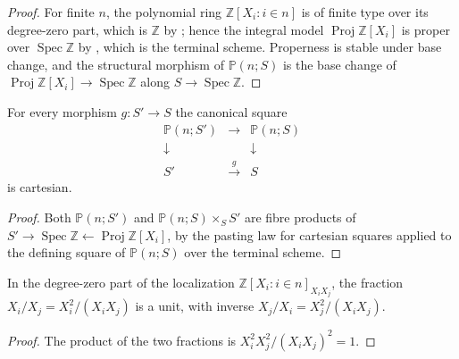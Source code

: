 \begin{proof}
  \leanok
  For finite \(n\), the polynomial ring \(\mathbb{Z}[X_i : i \in n]\) is of
  finite type over its degree-zero part, which is \(\mathbb{Z}\) by
  ; hence the integral model
  \(\operatorname{Proj} \mathbb{Z}[X_i]\) is proper over
  \(\operatorname{Spec} \mathbb{Z}\) by ,
  which is the terminal scheme.  Properness is stable under base change, and
  the structural morphism of \(\mathbb{P}(n; S)\) is the base change of
  \(\operatorname{Proj} \mathbb{Z}[X_i] \to \operatorname{Spec} \mathbb{Z}\)
  along \(S \to \operatorname{Spec} \mathbb{Z}\).
\end{proof}

\begin{lemma}
  \label{lem:projective_space_base_change}
  \leanok
  For every morphism \(g : S' \to S\) the canonical square
  \[
    \begin{array}{ccc}
      \mathbb{P}(n; S') & \longrightarrow & \mathbb{P}(n; S) \\
      \downarrow & & \downarrow \\
      S' & \xrightarrow{\;g\;} & S
    \end{array}
  \]
  is cartesian.
\end{lemma}

\begin{proof}
  \leanok
  Both \(\mathbb{P}(n; S')\) and \(\mathbb{P}(n; S) \times_S S'\) are fibre
  products of \(S' \to \operatorname{Spec}\mathbb{Z} \leftarrow
  \operatorname{Proj} \mathbb{Z}[X_i]\), by the pasting law for cartesian
  squares applied to the defining square of \(\mathbb{P}(n; S)\) over the
  terminal scheme.
\end{proof}

\begin{lemma}
  \label{lem:serre_twist_transition_unit}
  \leanok
  In the degree-zero part of the localization
  \(\mathbb{Z}[X_i : i \in n]_{X_i X_j}\), the fraction
  \(X_i/X_j = X_i^2/(X_i X_j)\) is a unit, with inverse
  \(X_j/X_i = X_j^2/(X_i X_j)\).
\end{lemma}

\begin{proof}
  \leanok
  The product of the two fractions is
  \(X_i^2 X_j^2 / (X_i X_j)^2 = 1\).
\end{proof}

